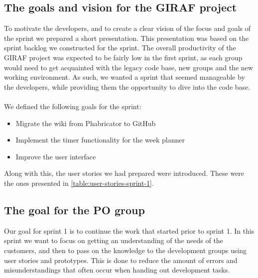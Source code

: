 \subsection{The goals and vision for the GIRAF project}
To motivate the developers, and to create a clear vision of the focus and goals of the sprint we prepared a short presentation.
This presentation was based on the sprint backlog we constructed for the sprint.
The overall productivity of the GIRAF project was expected to be fairly low in the first sprint, as each group would need to get acquainted with the legacy code base, new groups and the new working environment.
As such, we wanted a sprint that seemed manageable by the developers, while providing them the opportunity to dive into the code base.
\\\\
We defined the following goals for the sprint:
\begin{itemize}
    \item Migrate the wiki from Phabricator to GitHub
    \item Implement the timer functionality for the week planner
    \item Improve the user interface
\end{itemize}
Along with this, the user stories we had prepared were introduced. These were the ones presented in \autoref{table:user-stories-sprint-1}.

\subsection{The goal for the PO group}
Our goal for sprint 1 is to continue the work that started prior to sprint 1.
In this sprint we want to focus on getting an understanding of the needs of the customers, and then to pass on the knowledge to the development groups using user stories and prototypes.
This is done to reduce the amount of errors and misunderstandings that often occur when handing out development tasks.

